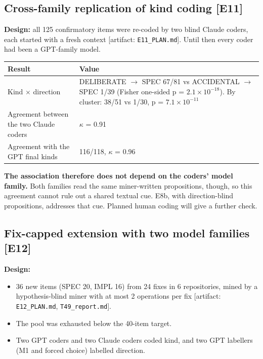 \documentclass[acmsmall,screen,review,anonymous]{acmart}
\newcommand{\artifact}[1]{{\footnotesize [artifact: #1]}}
\begin{document}
\subsection{Cross-family replication of kind coding [E11]}
\textbf{Design:} all 125 confirmatory items were re-coded by two blind Claude coders, each started with a fresh context \artifact{\texttt{E11\_PLAN.md}}. Until then every coder had been a GPT-family model.

\begin{table}[t]
\small
\begin{tabularx}{\linewidth}{lX}
\toprule
Result & Value \\
\midrule
Kind $\times$ direction & DELIBERATE $\rightarrow$ SPEC 67/81 vs ACCIDENTAL $\rightarrow$ SPEC 1/39 (Fisher one-sided p = $2.1 \times 10^{-18}$). By cluster: 38/51 vs 1/30, p = $7.1 \times 10^{-11}$ \\
Agreement between the two Claude coders & $\kappa$ = 0.91 \\
Agreement with the GPT final kinds & 116/118, $\kappa$ = 0.96 \\
\bottomrule
\end{tabularx}
\end{table}

\textbf{The association therefore does not depend on the coders' model family.} Both families read the same miner-written propositions, though, so this agreement cannot rule out a shared textual cue. E8b, with direction-blind propositions, addresses that cue. Planned human coding will give a further check.

\subsection{Fix-capped extension with two model families [E12]}
\textbf{Design:}
\begin{itemize}
\item 36 new items (SPEC 20, IMPL 16) from 24 fixes in 6 repositories, mined by a hypothesis-blind miner with at most 2 operations per fix \artifact{\texttt{E12\_PLAN.md}, \texttt{T49\_report.md}}.
\item The pool was exhausted below the 40-item target.
\item Two GPT coders and two Claude coders coded kind, and two GPT labellers (M1 and forced choice) labelled direction.
\end{itemize}
\end{document}
